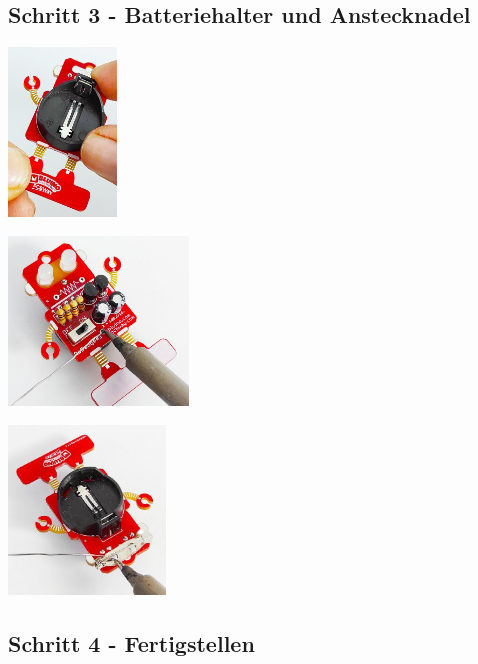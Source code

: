 \documentclass[a4paper]{article}
\begin{document}
\subsection{Schritt 3 - Batteriehalter und Anstecknadel}
\begin{minipage}[t]{0.33\textwidth}
  \centering
  \includegraphics[height=4.5cm]{../pictures/Battery.jpg}
  \label{img:Halter}
  \end{minipage}
\begin{minipage}[t]{0.33\textwidth}
  \centering
  \includegraphics[height=4.5cm]{../pictures/Loeten2.jpg}
  \label{img:Loeten2}
\end{minipage}
\begin{minipage}[t]{0.33\textwidth}
  \centering
  \includegraphics[height=4.5cm]{../pictures/Halter.jpg}
  \label{img:Loeten2}
\end{minipage}
\subsection{Schritt 4 - Fertigstellen}
\end{document}
